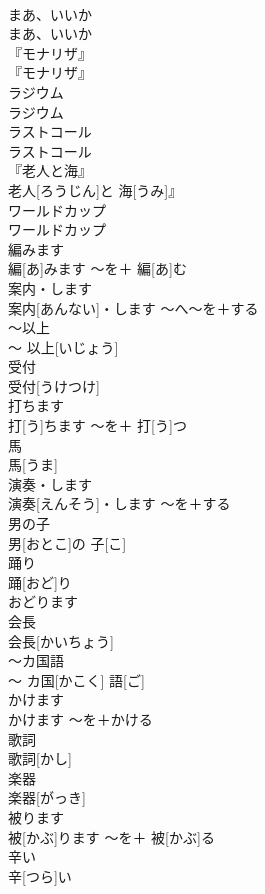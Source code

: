 \documentclass[8pt]{extreport}
\begin{document}
\begin{CJK}{UTF8}{min}
\\	まあ、いいか	
\\	まあ、いいか		
\\	『モナリザ』	
\\	『モナリザ』		
\\	ラジウム	
\\	ラジウム		
\\	ラストコール	
\\	ラストコール		
\\	『老人と海』	
\\	老人[ろうじん]と 海[うみ]』		
\\	ワールドカップ	
\\	ワールドカップ		
\\	編みます	
\\	編[あ]みます	〜を＋ 編[あ]む	
\\	案内・します	
\\	案内[あんない]・します	〜へ〜を＋する	
\\	〜以上	
\\	〜 以上[いじょう]		
\\	受付	
\\	受付[うけつけ]		
\\	打ちます	
\\	打[う]ちます	〜を＋ 打[う]つ	
\\	馬	
\\	馬[うま]		
\\	演奏・します	
\\	演奏[えんそう]・します	〜を＋する	
\\	男の子	
\\	男[おとこ]の 子[こ]		
\\	踊り	
\\	踊[おど]り	
\\	おどります 
\\	会長	
\\	会長[かいちょう]		
\\	〜カ国語	
\\	〜 カ国[かこく] 語[ご]		
\\	かけます	
\\	かけます	〜を＋かける	
\\	歌詞	
\\	歌詞[かし]		
\\	楽器	
\\	楽器[がっき]		
\\	被ります	
\\	被[かぶ]ります	〜を＋ 被[かぶ]る	
\\	辛い	
\\	辛[つら]い		

\end{CJK}
\end{document}
